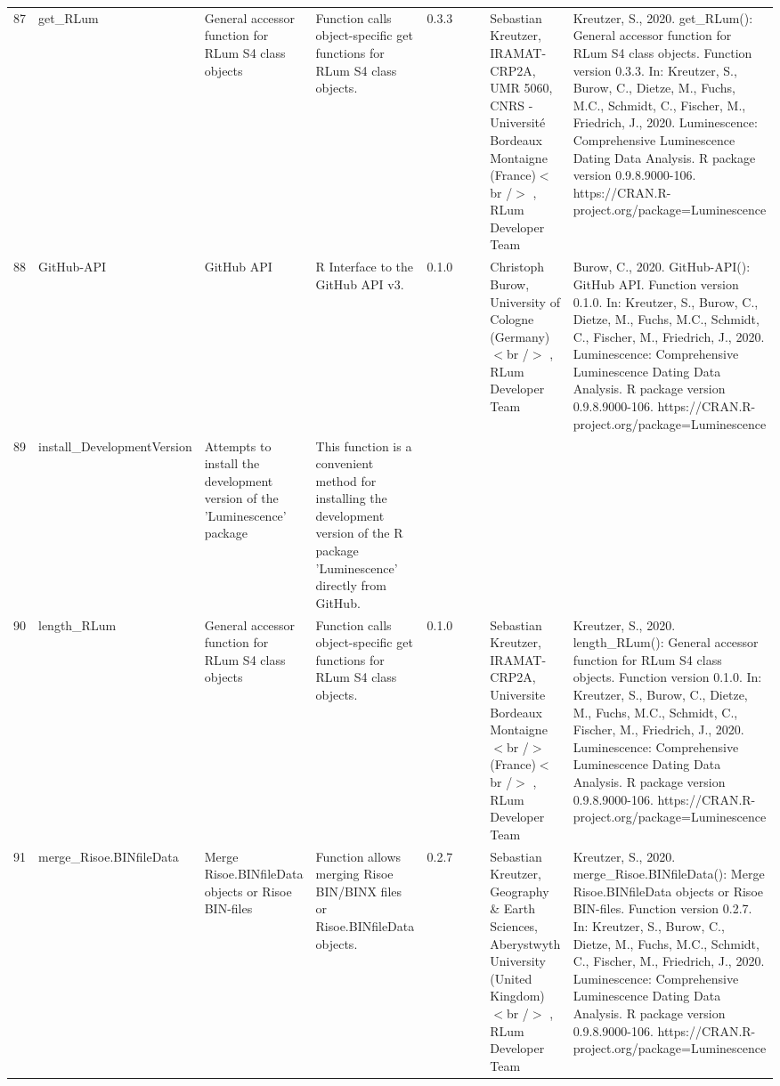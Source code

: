 \begin{table}[ht]
\begin{tabular}{rllllllll}
 \\ 
  87 & get\_RLum & General accessor function for RLum S4 class objects & Function calls object-specific get functions for RLum S4 class objects. & 0.3.3
 &  &  & Sebastian Kreutzer, IRAMAT-CRP2A, UMR 5060, CNRS - Université Bordeaux Montaigne (France)$<$br /$>$ , RLum Developer Team & Kreutzer, S., 2020. get\_RLum(): General accessor function for RLum S4 class objects. Function version 0.3.3. In: Kreutzer, S., Burow, C., Dietze, M., Fuchs, M.C., Schmidt, C., Fischer, M., Friedrich, J., 2020. Luminescence: Comprehensive Luminescence Dating Data Analysis. R package version 0.9.8.9000-106. https://CRAN.R-project.org/package=Luminescence
 \\ 
  88 & GitHub-API & GitHub API & R Interface to the GitHub API v3. & 0.1.0
 &  &  & Christoph Burow, University of Cologne (Germany)$<$br /$>$ , RLum Developer Team & Burow, C., 2020. GitHub-API(): GitHub API. Function version 0.1.0. In: Kreutzer, S., Burow, C., Dietze, M., Fuchs, M.C., Schmidt, C., Fischer, M., Friedrich, J., 2020. Luminescence: Comprehensive Luminescence Dating Data Analysis. R package version 0.9.8.9000-106. https://CRAN.R-project.org/package=Luminescence
 \\ 
  89 & install\_DevelopmentVersion & Attempts to install the development version of the 'Luminescence' package & This function is a convenient method for installing the development version of the R package 'Luminescence' directly from GitHub. &  &  &  &  &  \\ 
  90 & length\_RLum & General accessor function for RLum S4 class objects & Function calls object-specific get functions for RLum S4 class objects. & 0.1.0
 &  &  & Sebastian Kreutzer, IRAMAT-CRP2A, Universite Bordeaux Montaigne$<$br /$>$ (France)$<$br /$>$ , RLum Developer Team & Kreutzer, S., 2020. length\_RLum(): General accessor function for RLum S4 class objects. Function version 0.1.0. In: Kreutzer, S., Burow, C., Dietze, M., Fuchs, M.C., Schmidt, C., Fischer, M., Friedrich, J., 2020. Luminescence: Comprehensive Luminescence Dating Data Analysis. R package version 0.9.8.9000-106. https://CRAN.R-project.org/package=Luminescence
 \\ 
  91 & merge\_Risoe.BINfileData & Merge Risoe.BINfileData objects or Risoe BIN-files & Function allows merging Risoe BIN/BINX files or Risoe.BINfileData objects. & 0.2.7
 &  &  & Sebastian Kreutzer, Geography \& Earth Sciences, Aberystwyth University (United Kingdom)$<$br /$>$ , RLum Developer Team & Kreutzer, S., 2020. merge\_Risoe.BINfileData(): Merge Risoe.BINfileData objects or Risoe BIN-files. Function version 0.2.7. In: Kreutzer, S., Burow, C., Dietze, M., Fuchs, M.C., Schmidt, C., Fischer, M., Friedrich, J., 2020. Luminescence: Comprehensive Luminescence Dating Data Analysis. R package version 0.9.8.9000-106. https://CRAN.R-project.org/package=Luminescence

\end{tabular}
\end{table}
